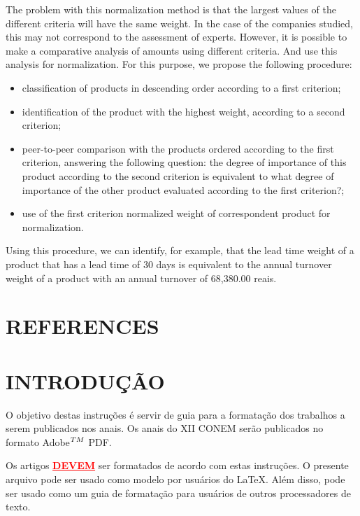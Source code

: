 \documentclass[10pt,fleqn,a4paper,twoside]{article}
\begin{document}
	The problem with this normalization method is that the largest values of the different criteria will have the same weight. In the case of the companies studied, this may not correspond to the assessment of experts. However, it is possible to make a comparative analysis of amounts using different criteria. And use this analysis for normalization. For this purpose, we propose the following procedure:

\begin{itemize}
\item classification of products in descending order according to a first criterion;
\item identification of the product with the highest weight, according to a second criterion;
\item peer-to-peer comparison with the products ordered according to the first criterion, answering the following question: the degree of importance of this product according to the second criterion is equivalent to what degree of importance of the other product evaluated according to the first criterion?;
\item use of the first criterion normalized weight of correspondent product for normalization.
\end{itemize}

Using this procedure, we can identify, for example, that the lead time weight of a product that has a lead time of 30 days is equivalent to the annual turnover weight of a product with an annual turnover of 68,380.00 reais.


    \section{REFERENCES}
    
    \section{INTRODUÇÃO}
        
        O objetivo destas instruções é servir de guia para a formatação dos trabalhos a serem publicados nos anais. Os anais do XII CONEM serão publicados no formato Adobe$^{\small{TM}}$ PDF.

        Os artigos \textcolor{red}{\underline{\textbf{DEVEM}}} ser formatados de acordo com estas instruções. O presente arquivo pode ser usado como modelo por usuários do \LaTeX. Além disso, pode ser usado como um guia de formatação para usuários de outros processadores de texto.
\end{document}

